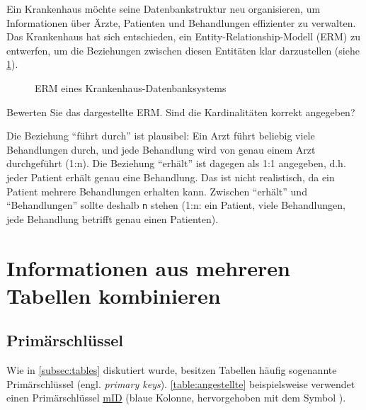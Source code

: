 \begin{myexercise}
  Ein Krankenhaus möchte seine Datenbankstruktur neu organisieren, um Informationen über Ärzte, Patienten und Behandlungen effizienter zu verwalten. Das Krankenhaus hat sich entschieden, ein Entity-Relationship-Modell (ERM) zu entwerfen, um die Beziehungen zwischen diesen Entitäten klar darzustellen (siehe \cref{fig:erm-hospital}).
  \begin{figure}[H]
    \centering
    \caption{ERM eines Krankenhaus-Datenbanksystems}
    \label{fig:erm-hospital}
  \end{figure}
  Bewerten Sie das dargestellte ERM. Sind die Kardinalitäten korrekt angegeben?
  \begin{myanswer}
    Die Beziehung \enquote{führt durch} ist plausibel: Ein Arzt führt beliebig viele Behandlungen durch, und jede Behandlung wird von genau einem Arzt durchgeführt (1:n). Die Beziehung \enquote{erhält} ist dagegen als 1:1 angegeben, d.h. jeder Patient erhält genau eine Behandlung. Das ist nicht realistisch, da ein Patient mehrere Behandlungen erhalten kann. Zwischen \enquote{erhält} und \enquote{Behandlungen} sollte deshalb \texttt{n} stehen (1:n: ein Patient, viele Behandlungen, jede Behandlung betrifft genau einen Patienten).
  \end{myanswer}
\end{myexercise}


\clearpage


\section{Informationen aus mehreren Tabellen kombinieren}
\subsection{Primärschlüssel}
Wie in \cref{subsec:tables} diskutiert wurde, besitzen Tabellen häufig sogenannte Primärschlüssel (engl. \textit{primary keys}). \cref{table:angestellte} beispielsweise verwendet einen Primärschlüssel \underline{mID} (blaue Kolonne, hervorgehoben mit dem Symbol ).

